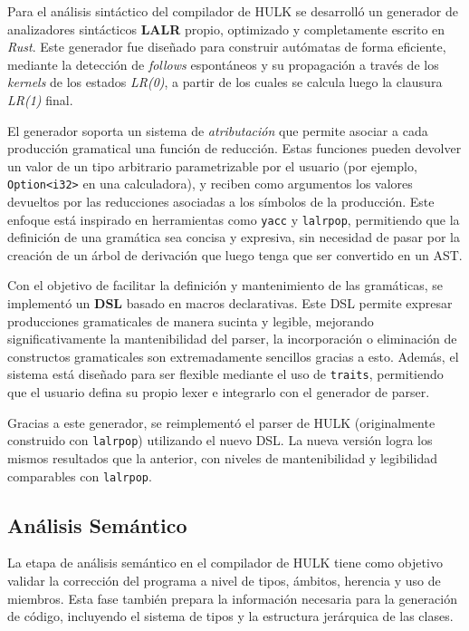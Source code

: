 \documentclass{article}
\begin{document}
Para el análisis sintáctico del compilador de HULK se desarrolló un generador de analizadores sintácticos \textbf{LALR} propio, optimizado y completamente escrito en \textit{Rust}. Este generador fue diseñado para construir autómatas de forma eficiente, mediante la detección de \textit{follows} espontáneos y su propagación a través de los \textit{kernels} de los estados \textit{LR(0)}, a partir de los cuales se calcula luego la clausura \textit{LR(1)} final.

El generador soporta un sistema de \textit{atributación} que permite asociar a cada producción gramatical una función de reducción. Estas funciones pueden devolver un valor de un tipo arbitrario parametrizable por el usuario (por ejemplo, \texttt{Option<i32>} en una calculadora), y reciben como argumentos los valores devueltos por las reducciones asociadas a los símbolos de la producción. Este enfoque está inspirado en herramientas como \texttt{yacc} y \texttt{lalrpop}, permitiendo que la definición de una gramática sea concisa y expresiva, sin necesidad de pasar por la creación de un árbol de derivación que luego tenga que ser convertido en un AST.

Con el objetivo de facilitar la definición y mantenimiento de las gramáticas, se implementó un \textbf{DSL} basado en macros declarativas. Este DSL permite expresar producciones gramaticales de manera sucinta y legible, mejorando significativamente la mantenibilidad del parser, la incorporación o eliminación de constructos gramaticales son extremadamente sencillos gracias a esto. Además, el sistema está diseñado para ser flexible mediante el uso de \texttt{traits}, permitiendo que el usuario defina su propio lexer e integrarlo con el generador de parser.

Gracias a este generador, se reimplementó el parser de HULK (originalmente construido con \texttt{lalrpop}) utilizando el nuevo DSL. La nueva versión logra los mismos resultados que la anterior, con niveles de mantenibilidad y legibilidad comparables con \texttt{lalrpop}.

\subsection{Análisis Semántico}

La etapa de análisis semántico en el compilador de HULK tiene como objetivo validar la corrección del programa a nivel de tipos, ámbitos, herencia y uso de miembros. Esta fase también prepara la información necesaria para la generación de código, incluyendo el sistema de tipos y la estructura jerárquica de las clases.
\end{document}
